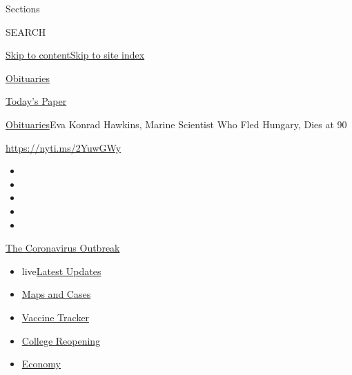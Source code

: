 Sections

SEARCH

\protect\hyperlink{site-content}{Skip to
content}\protect\hyperlink{site-index}{Skip to site index}

\href{https://www.nytimes3xbfgragh.onion/section/obituaries}{Obituaries}

\href{https://myaccount.nytimes3xbfgragh.onion/auth/login?response_type=cookie\&client_id=vi}{}

\href{https://www.nytimes3xbfgragh.onion/section/todayspaper}{Today's
Paper}

\href{/section/obituaries}{Obituaries}\textbar{}Eva Konrad Hawkins,
Marine Scientist Who Fled Hungary, Dies at 90

\url{https://nyti.ms/2YuwGWy}

\begin{itemize}
\item
\item
\item
\item
\item
\end{itemize}

\href{https://www.nytimes3xbfgragh.onion/news-event/coronavirus?action=click\&pgtype=Article\&state=default\&region=TOP_BANNER\&context=storylines_menu}{The
Coronavirus Outbreak}

\begin{itemize}
\tightlist
\item
  live\href{https://www.nytimes3xbfgragh.onion/2020/08/04/world/coronavirus-covid-19.html?action=click\&pgtype=Article\&state=default\&region=TOP_BANNER\&context=storylines_menu}{Latest
  Updates}
\item
  \href{https://www.nytimes3xbfgragh.onion/interactive/2020/us/coronavirus-us-cases.html?action=click\&pgtype=Article\&state=default\&region=TOP_BANNER\&context=storylines_menu}{Maps
  and Cases}
\item
  \href{https://www.nytimes3xbfgragh.onion/interactive/2020/science/coronavirus-vaccine-tracker.html?action=click\&pgtype=Article\&state=default\&region=TOP_BANNER\&context=storylines_menu}{Vaccine
  Tracker}
\item
  \href{https://www.nytimes3xbfgragh.onion/2020/08/02/us/covid-college-reopening.html?action=click\&pgtype=Article\&state=default\&region=TOP_BANNER\&context=storylines_menu}{College
  Reopening}
\item
  \href{https://www.nytimes3xbfgragh.onion/live/2020/08/03/business/stock-market-today-coronavirus?action=click\&pgtype=Article\&state=default\&region=TOP_BANNER\&context=storylines_menu}{Economy}
\end{itemize}


